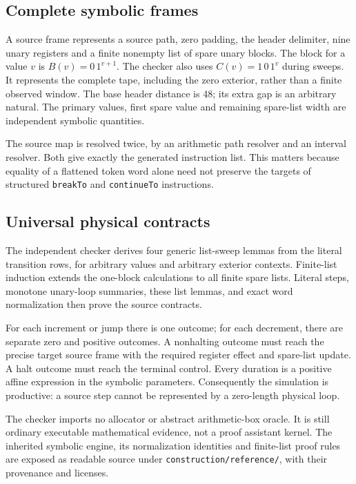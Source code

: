 \documentclass[11pt,letterpaper]{article}
\newcommand{\file}[1]{\texttt{\nolinkurl{#1}}}
\begin{document}
\subsection{Complete symbolic frames}

A source frame represents a source path, zero padding, the header
delimiter, nine unary registers and a finite nonempty list of spare
unary blocks. The block for a value \(v\) is
\(B(v)=0\,1^{v+1}\). The checker also uses
\(C(v)=1\,0\,1^v\) during sweeps. It represents the complete tape,
including the zero exterior, rather than a finite observed window.
The base header distance is 48; its extra gap is an arbitrary natural.
The primary values, first spare value and remaining spare-list width are
independent symbolic quantities.

The source map is resolved twice, by an arithmetic path resolver and an
interval resolver. Both give exactly the generated instruction list.
This matters because equality of a flattened token word alone need not
preserve the targets of structured \file{breakTo} and \file{continueTo}
instructions.

\subsection{Universal physical contracts}

The independent checker derives four generic list-sweep lemmas from the
literal transition rows, for arbitrary values and arbitrary exterior
contexts. Finite-list induction extends the one-block calculations to
all finite spare lists. Literal steps, monotone unary-loop summaries,
these list lemmas, and exact word normalization then prove the source
contracts.

For each increment or jump there is one outcome; for each decrement,
there are separate zero and positive outcomes. A nonhalting outcome must
reach the precise target source frame with the required register effect
and spare-list update. A halt outcome must reach the terminal control.
Every duration is a positive affine expression in the symbolic
parameters. Consequently the simulation is productive: a source step
cannot be represented by a zero-length physical loop.



The checker imports no allocator or abstract arithmetic-box oracle.
It is still ordinary executable mathematical evidence, not a proof
assistant kernel. The inherited symbolic engine, its normalization
identities and finite-list proof rules are exposed as readable source
under \file{construction/reference/}, with their provenance and licenses.
\end{document}
